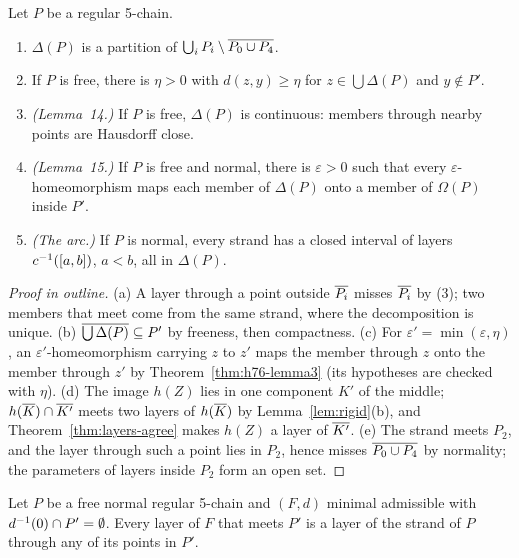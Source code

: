 \begin{proposition}\label{prop:delta}
Let $P$ be a regular 5-chain.
\begin{enumerate}[label=(\alph*)]
\item $\Delta(P)$ is a partition of $\bigcup_iP_i\setminus\overline{P_0\cup P_4}$.
\item If $P$ is free, there is $\eta>0$ with $d(z,y)\ge\eta$ for $z\in\bigcup\Delta(P)$ and $y\notin P'$.
\item \emph{(Lemma~14.)} If $P$ is free, $\Delta(P)$ is continuous: members through nearby points are Hausdorff close.
\item \emph{(Lemma~15.)} If $P$ is free and normal, there is $\varepsilon>0$ such that every $\varepsilon$-homeomorphism maps each member of
$\Delta(P)$ onto a member of $\Omega(P)$ inside $P'$.
\item \emph{(The arc.)} If $P$ is normal, every strand has a closed interval of layers $c^{-1}([a,b])$, $a<b$, all in $\Delta(P)$.
\end{enumerate}
\end{proposition}

\begin{proof}[Proof in outline]
(a) A layer through a point outside $\overline{P_i}$ misses $\overline{P_i}$ by (3); two members that meet come from the same strand,
where the decomposition is unique. (b) $\overline{\bigcup\Delta(P)}\subseteq P'$ by freeness, then compactness. (c) For $\varepsilon'=\min(\varepsilon,\eta)$,
an $\varepsilon'$-homeomorphism carrying $z$ to $z'$ maps the member through $z$ onto the member through $z'$ by
Theorem~\ref{thm:h76-lemma3} (its hypotheses are checked with $\eta$). (d) The image $h(Z)$ lies in one component $K'$ of
the middle; $h(\overline{K})\cap\overline{K'}$ meets two layers of $h(\overline{K})$ by Lemma~\ref{lem:rigid}(b), and
Theorem~\ref{thm:layers-agree} makes $h(Z)$ a layer of $\overline{K'}$. (e) The strand meets $P_2$, and the layer through such a
point lies in $P_2$, hence misses $\overline{P_0\cup P_4}$ by normality; the parameters of layers inside $P_2$ form an open set.
\end{proof}


\begin{theorem}[Lemma~16$'$]\label{thm:lemma16p}
Let $P$ be a free normal regular 5-chain and $(F,d)$ minimal admissible with $d^{-1}(0)\cap P'=\emptyset$. Every layer of $F$ that meets
$P'$ is a layer of the strand of $P$ through any of its points in $P'$.
\end{theorem}


